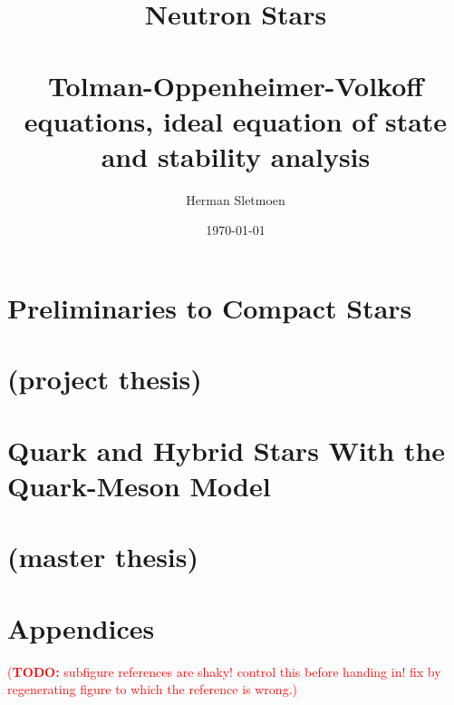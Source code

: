 \documentclass[a4paper,11pt,twoside]{book}
\title{%
	Neutron Stars \\ \ \\
	\normalsize Tolman-Oppenheimer-Volkoff equations, ideal equation of state and stability analysis
}
\author{Herman Sletmoen}
\date{\today}
\newcommand\TODO[1]{\textcolor{red}{(\textbf{TODO:} #1)}}
\newcommand{\1}{\mathds{1}}
\begin{document}
\frontmatter
\begin{titlepage}
\end{titlepage}



\tableofcontents


\mainmatter
\part[Preliminaries to Compact Stars (project thesis)]%
{Preliminaries to Compact Stars \\ \ \\ (project thesis)} \label{part:project}





\part[Quark and Hybrid Stars With the Quark-Meson Model (master thesis)]%
{Quark and Hybrid Stars With the Quark-Meson Model \\ \ \\ (master thesis)} \label{part:master}






\part{Appendices} \label{part:appendices}


\backmatter
\printbibliography[heading=bibintoc, title={References}]


\TODO{subfigure references are shaky! control this before handing in! fix by regenerating figure to which the reference is wrong.}

\cleartoevenpage %

\end{document}
